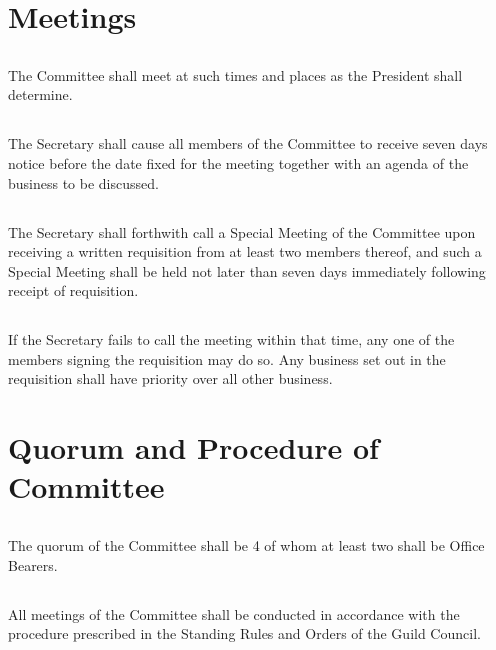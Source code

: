 \documentclass[10.5pt]{article}
\begin{document}
\section{Meetings}
\subsection{} The Committee shall meet at such times and places as the President shall determine.
\subsection{} The Secretary shall cause all members of the Committee to receive seven days notice before
the date fixed for the meeting together with an agenda of the business to be discussed.
\subsection{} The Secretary shall forthwith call a Special Meeting of the Committee upon receiving a
written requisition from at least two members thereof, and such a Special Meeting shall be held not
later than seven days immediately following receipt of requisition.
\subsection{} If the Secretary fails to call the meeting within that time, any one of the members signing the requisition may do so. Any business set out in the requisition shall have priority over all other business.
\newline


\section{Quorum and Procedure of Committee}
\subsection{} The quorum of the Committee shall be 4 of whom at least two shall be Office Bearers.
\subsection{} All meetings of the Committee shall be conducted in accordance with the procedure prescribed
in the Standing Rules and Orders of the Guild Council.
\newline
\end{document}
